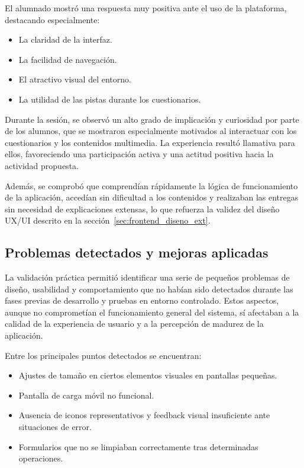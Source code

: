 El alumnado mostró una respuesta muy positiva ante el uso de la plataforma, destacando especialmente:

\begin{itemize}
    \item La claridad de la interfaz.
    \item La facilidad de navegación.
    \item El atractivo visual del entorno.
    \item La utilidad de las pistas durante los cuestionarios.
\end{itemize}

Durante la sesión, se observó un alto grado de implicación y curiosidad por parte de los alumnos, que se mostraron especialmente motivados al interactuar con los cuestionarios y los contenidos multimedia. La experiencia resultó llamativa para ellos, favoreciendo una participación activa y una actitud positiva hacia la actividad propuesta.

Además, se comprobó que comprendían rápidamente la lógica de funcionamiento de la aplicación, accedían sin dificultad a los contenidos y realizaban las entregas sin necesidad de explicaciones extensas, lo que refuerza la validez del diseño UX/UI descrito en la sección~\ref{sec:frontend_diseno_ext}.

\subsection{Problemas detectados y mejoras aplicadas}

La validación práctica permitió identificar una serie de pequeños problemas de diseño, usabilidad y comportamiento que no habían sido detectados durante las fases previas de desarrollo y pruebas en entorno controlado. Estos aspectos, aunque no comprometían el funcionamiento general del sistema, sí afectaban a la calidad de la experiencia de usuario y a la percepción de madurez de la aplicación.

Entre los principales puntos detectados se encuentran:

\begin{itemize}
    \item Ajustes de tamaño en ciertos elementos visuales en pantallas pequeñas.
    \item Pantalla de carga móvil no funcional.
    \item Ausencia de iconos representativos y feedback visual insuficiente ante situaciones de error.
    \item Formularios que no se limpiaban correctamente tras determinadas operaciones.
\end{itemize}

